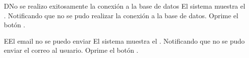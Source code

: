		
		
		\begin{UCtrayectoriaA}{D}{No se realizo exitosamente la conexión a la base de datos}
			\UCpaso[\UCsist] El sistema muestra el . Notificando que no se pudo realizar la conexión a la base de datos.
			\UCpaso[\UCactor] Oprime el botón .
		\end{UCtrayectoriaA}
		
		\begin{UCtrayectoriaA}{E}{El email no se puedo enviar}
			\UCpaso[\UCsist] El sistema muestra el . Notificando que no se pudo enviar el correo al usuario.
			\UCpaso[\UCactor] Oprime el botón .
		\end{UCtrayectoriaA}
		
